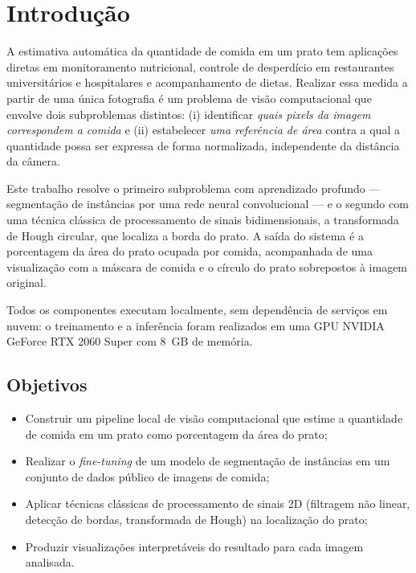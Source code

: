 \documentclass[12pt,a4paper]{article}
\begin{document}
\tableofcontents
\newpage

\section{Introdução}

A estimativa automática da quantidade de comida em um prato tem aplicações diretas em
monitoramento nutricional, controle de desperdício em restaurantes universitários e
hospitalares e acompanhamento de dietas. Realizar essa medida a partir de uma única fotografia
é um problema de visão computacional que envolve dois subproblemas distintos: (i) identificar
\emph{quais pixels da imagem correspondem a comida} e (ii) estabelecer \emph{uma referência de
área} contra a qual a quantidade possa ser expressa de forma normalizada, independente da
distância da câmera.

Este trabalho resolve o primeiro subproblema com aprendizado profundo --- segmentação de
instâncias por uma rede neural convolucional --- e o segundo com uma técnica clássica de
processamento de sinais bidimensionais, a transformada de Hough circular, que localiza a borda
do prato. A saída do sistema é a porcentagem da área do prato ocupada por comida, acompanhada
de uma visualização com a máscara de comida e o círculo do prato sobrepostos à imagem original.

Todos os componentes executam localmente, sem dependência de serviços em nuvem: o treinamento
e a inferência foram realizados em uma GPU NVIDIA GeForce RTX 2060 Super com 8~GB de memória.

\subsection{Objetivos}
\begin{itemize}
  \item Construir um pipeline local de visão computacional que estime a quantidade de comida
        em um prato como porcentagem da área do prato;
  \item Realizar o \emph{fine-tuning} de um modelo de segmentação de instâncias em um conjunto
        de dados público de imagens de comida;
  \item Aplicar técnicas clássicas de processamento de sinais 2D (filtragem não linear,
        detecção de bordas, transformada de Hough) na localização do prato;
  \item Produzir visualizações interpretáveis do resultado para cada imagem analisada.
\end{itemize}
\end{document}
